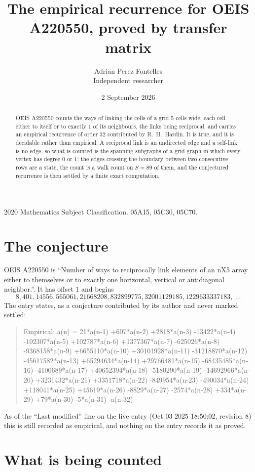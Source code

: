 \documentclass[11pt,a4paper]{article}
\title{The empirical recurrence for OEIS A220550, proved by transfer matrix}
\author{Adrian Perez Fontelles\\ \small Independent researcher}
\date{2 September 2026}
\theoremstyle{plain}
\theoremstyle{definition}
\begin{document}
\maketitle

\begin{abstract}
OEIS A220550 counts the ways of linking the cells of a grid $5$ cells wide, each cell either to
itself or to exactly $1$ of its neighbours, the links being reciprocal, and carries an
empirical recurrence of order $32$ contributed by R.~H.~Hardin. It is true, and it is
decidable rather than empirical. A reciprocal link is an undirected edge and a self-link is
no edge, so what is counted is the spanning subgraphs of a grid graph in which every vertex
has degree $0$ or $1$; the edges crossing the boundary between two consecutive rows are a
state, the count is a walk count on $S=89$ of them, and the conjectured recurrence is then
settled by a finite exact computation.
\end{abstract}

\noindent\small 2020 Mathematics Subject Classification. 05A15, 05C30, 05C70.\normalsize

\section{The conjecture}

OEIS A220550 is ``Number of ways to reciprocally link elements of an nX5 array either to themselves or to exactly one horizontal, vertical or antidiagonal neighbor.''. It has offset $1$ and begins
\[
8, 401, 14556, 565061, 21668208, 832899775, 32001129185, 1229633337183,\ \dots
\]
The entry states, as a conjecture contributed by its author and never marked settled:
\begin{quote}
Empirical: a(n) = 21*a(n-1) +607*a(n-2) +2818*a(n-3) -13422*a(n-4) -102307*a(n-5) +102787*a(n-6) +1377367*a(n-7) -625026*a(n-8) -9368158*a(n-9) +6655110*a(n-10) +30101928*a(n-11) -31218870*a(n-12) -45617582*a(n-13) +65294634*a(n-14) +29766481*a(n-15) -68435485*a(n-16) -4100689*a(n-17) +40652394*a(n-18) -5180290*a(n-19) -14692966*a(n-20) +3231432*a(n-21) +3351718*a(n-22) -849954*a(n-23) -490034*a(n-24) +118041*a(n-25) +45619*a(n-26) -8829*a(n-27) -2574*a(n-28) +334*a(n-29) +79*a(n-30) -5*a(n-31) -a(n-32)
\end{quote}
As of the ``Last modified'' line on the live entry (Oct 03 2025 18:50:02, revision 8) this is still
recorded as empirical, and nothing on the entry records it as proved.

\section{What is being counted}
\end{document}
